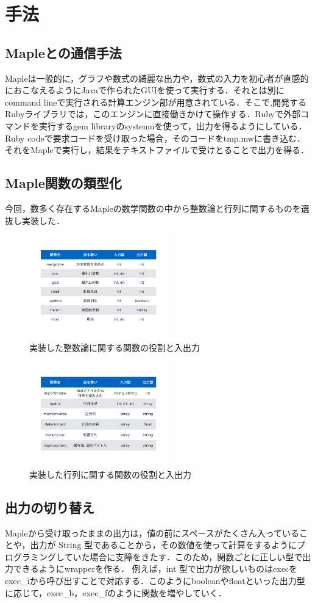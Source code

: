 \section{手法}
\subsection{Mapleとの通信手法}
Mapleは一般的に，グラフや数式の綺麗な出力や，数式の入力を初心者が直感的におこなえるようにJavaで作られたGUIを使って実行する．それとは別にcommand lineで実行される計算エンジン部が用意されている．そこで,開発するRubyライブラリでは，このエンジンに直接働きかけて操作する．Rubyで外部コマンドを実行するgem libraryのsystemuを使って，出力を得るようにしている．Ruby codeで要求コードを受け取った場合，そのコードをtmp.mwに書き込む．それをMapleで実行し，結果をテキストファイルで受けとることで出力を得る．

\subsection{Maple関数の類型化}
今回，数多く存在するMapleの数学関数の中から整数論と行列に関するものを選抜し実装した．

\begin{figure}[htbp]\begin{center}
\includegraphics[width=6cm,bb=0 0 442 500]{../figs/./mapleruby_eringi.001.png}
\caption{実装した整数論に関する関数の役割と入出力}
\label{default}\end{center}\end{figure}
\begin{figure}[htbp]\begin{center}
\includegraphics[width=6cm,bb=0 0 442 500]{../figs/./mapleruby_eringi.002.png}
\caption{実装した行列に関する関数の役割と入出力}
\label{default}\end{center}\end{figure}
\subsection{出力の切り替え}
Mapleから受け取ったままの出力は，値の前にスペースがたくさん入っていることや，出力が String 型であることから，その数値を使って計算をするようにプログラミングしていた場合に支障をきたす．このため，関数ごとに正しい型で出力できるようにwrapperを作る．
例えば，int 型で出力が欲しいものはexecをexec\_iから呼び出すことで対応する．このようにbooleanやfloatといった出力型に応じて，exec\_b，exec\_fのように関数を増やしていく．

